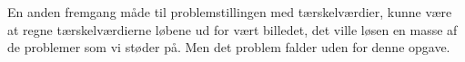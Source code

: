 En anden fremgang måde til problemstillingen med tærskelværdier, kunne
være at regne tærskelværdierne løbene ud for vært billedet, det ville
løsen en masse af de problemer som vi støder på. Men det problem falder
uden for denne opgave.

